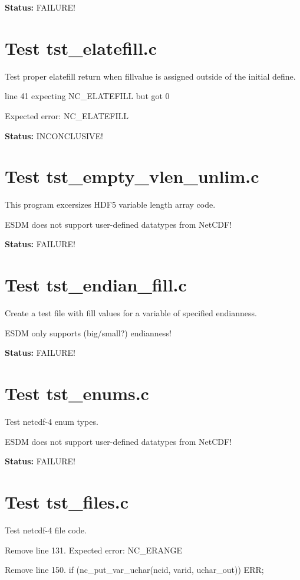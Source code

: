{\bf \large Status: } FAILURE!

\section{Test tst\_elatefill.c}

Test proper elatefill return when fillvalue is assigned outside of
the initial define.

line 41 expecting NC\_ELATEFILL but got 0

Expected error: NC\_ELATEFILL

{\bf \large Status: } INCONCLUSIVE!

\section{Test tst\_empty\_vlen\_unlim.c}

This program excersizes HDF5 variable length array code.

ESDM does not support user-defined datatypes from NetCDF!

{\bf \large Status: } FAILURE!

\section{Test tst\_endian\_fill.c}

Create a test file with fill values for a variable of specified endianness.

ESDM only supports (big/small?) endianness!

{\bf \large Status: } FAILURE!

\section{Test tst\_enums.c}

Test netcdf-4 enum types.

ESDM does not support user-defined datatypes from NetCDF!

{\bf \large Status: } FAILURE!

\section{Test tst\_files.c}

Test netcdf-4 file code.

Remove line 131. Expected error: NC\_ERANGE

Remove line 150. if (nc\_put\_var\_uchar(ncid, varid, uchar\_out)) ERR;

